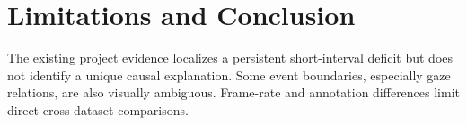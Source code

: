 \section{Limitations and Conclusion}
The existing project evidence localizes a persistent short-interval deficit but
does not identify a unique causal explanation. Some event boundaries, especially
gaze relations, are also visually ambiguous. Frame-rate and annotation differences
limit direct cross-dataset comparisons.

